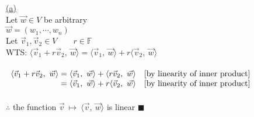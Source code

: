 \documentclass[12pt]{article}
\newcommand{\F}{\mathbb{F}}
\renewcommand{\qed}{\hfill$\blacksquare$}
\begin{document}
\hyperlink{toc}{\hypertarget{4.1}{(a)}}\\
Let $\vec{w} \in V$ be arbitrary\\
$\vec{w} = (w_1, \cdots, w_n)$\\
Let $\vec{v}_1, \vec{v}_2 \in V \qquad r \in \F$\\
WTS: $\langle \vec{v}_1 + r\vec{v}_2, \ \vec{w}\rangle = \langle \vec{v}_1, \ \vec{w}\rangle + r\langle \vec{v}_2, \ \vec{w}\rangle$
\\\\
{$\begin{array}{r@{}>{\displaystyle}ll}
		\langle \vec{v}_1 + r\vec{v}_2, \ \vec{w}\rangle & {}= \langle \vec{v}_1, \ \vec{w}\rangle +\langle r\vec{v}_2, \ \vec{w}\rangle & [\text{by linearity of inner product}] \\
		                                                 & {}= \langle \vec{v}_1, \ \vec{w}\rangle +r\langle \vec{v}_2, \ \vec{w}\rangle & [\text{by linearity of inner product}] \\
	\end{array}$}
\\\\
$\therefore$ the function $\vec{v}\ \mapsto\ \langle \vec{v}, \ \vec{w}\rangle$ is linear \qed
\\\\\\
\end{document}
